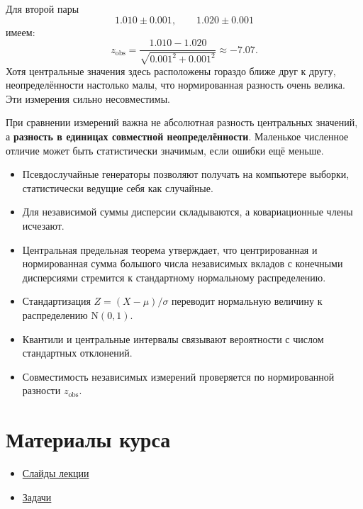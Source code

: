 \documentclass[
  russian,
  12pt,
  a4paper,
  a4paper,
  openany]{scrbook}
\providecommand{\tightlist}{%
  \setlength{\itemsep}{0pt}\setlength{\parskip}{0pt}}
\begin{document}
Для второй пары \[1.010\pm0.001,
\qquad
1.020\pm0.001\] имеем: \[
z_{\mathrm{obs}}=\frac{1.010-1.020}{\sqrt{0.001^2+0.001^2}}\approx -7.07.\]
Хотя центральные значения здесь расположены гораздо ближе друг к другу,
неопределённости настолько малы, что нормированная разность очень
велика. Эти измерения сильно несовместимы.

\begin{booknote}

При сравнении измерений важна не абсолютная разность центральных
значений, а \textbf{разность в единицах совместной неопределённости}.
Маленькое численное отличие может быть статистически значимым, если
ошибки ещё меньше.

\end{booknote}

\begin{bookchaptersummary}

\begin{itemize}
\tightlist
\item
  Псевдослучайные генераторы позволяют получать на компьютере выборки,
  статистически ведущие себя как случайные.
\item
  Для независимой суммы дисперсии складываются, а ковариационные члены
  исчезают.
\item
  Центральная предельная теорема утверждает, что центрированная и
  нормированная сумма большого числа независимых вкладов с конечными
  дисперсиями стремится к стандартному нормальному распределению.
\item
  Стандартизация \(Z=(X-\mu)/\sigma\) переводит нормальную величину к
  распределению \(\mathrm{N}(0,1)\).
\item
  Квантили и центральные интервалы связывают вероятности с числом
  стандартных отклонений.
\item
  Совместимость независимых измерений проверяется по нормированной
  разности \(z_{\mathrm{obs}}\).
\end{itemize}

\end{bookchaptersummary}

\section{Материалы
курса}\label{ux43cux430ux442ux435ux440ux438ux430ux43bux44b-ux43aux443ux440ux441ux430-1}

\begin{itemize}
\tightlist
\item
  \href{https://neutrinohit.github.io/statistical-analysis-course/ru/slides/03_central_limit_theorem.html}{Слайды
  лекции}
\item
  \href{https://neutrinohit.github.io/statistical-analysis-course/ru/slides/exercises/03_central_limit_theorem_exercises.html}{Задачи}
\end{itemize}
\end{document}
